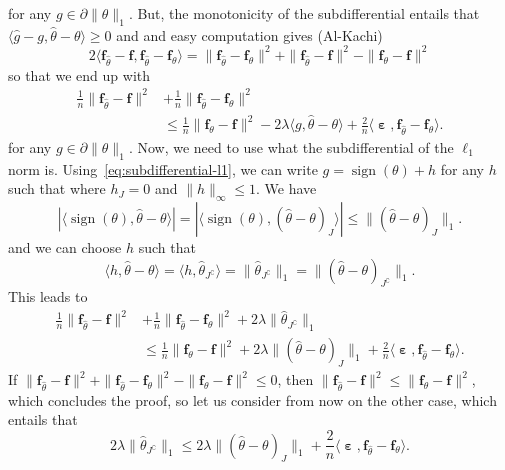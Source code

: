 \documentclass[
	fontsize=11pt, %
	twoside=false, %
	numbers=noenddot, %
]{kaobook}
\renewcommand{\bf}{{\boldsymbol f}}
\DeclareMathOperator{\beps}{\boldsymbol \varepsilon}
\newcommand{\wh}{\widehat}
\newcommand{\norm}[1]{\| #1 \|}
\newcommand{\inr}[1]{\langle #1 \rangle}
\DeclareMathOperator{\sign}{sign}
\begin{document}
for any $g \in \partial \norm{\theta}_1$. 
But, the monotonicity of the subdifferential entails that $\inr{\wh g - g, \wh \theta - \theta} \geq 0$ and and easy computation gives (Al-Kachi)
\begin{equation*}
	2 \inr{ \bf_{\wh \theta} - \bf, \bf_{\wh \theta} - \bf_{\theta}} 
	= \norm{\bf_{\wh \theta} - \bf_{\theta}}^2 
	+ \norm{\bf_{\wh \theta} - \bf}^2
	- \norm{\bf_{\theta} - \bf}^2
\end{equation*}
so that we end up with
\begin{align*}
	\frac 1n \norm{\bf_{\wh \theta} - \bf}^2 &
	+ \frac 1n \norm{\bf_{\wh \theta} - \bf_{\theta}}^2 \\
	&\leq \frac 1n \norm{\bf_{\theta} - \bf}^2
    - 2 \lambda \inr{g, \wh \theta - \theta} 
	+ \frac 2n  \inr{\beps,  \bf_{\wh \theta} - \bf_\theta}.
\end{align*}
for any $g \in \partial \norm{\theta}_1$.
Now, we need to use what the subdifferential of the $\ell_1$ norm is.
Using~\eqref{eq:subdifferential-l1}, we can write $g = \sign(\theta) + h$ for any $h$ such that where $h_J = 0$ and $\norm{h}_\infty \leq 1$.
We have 
\begin{equation*}
	|\inr{\sign(\theta), \wh \theta - \theta}| = |\inr{\sign(\theta), (\wh \theta - \theta)_J}| \leq \norm{(\wh \theta - \theta)_J}_1.
\end{equation*}
and we can choose $h$ such that
\begin{equation*}
	\inr{h, \wh \theta - \theta} = \inr{h, \wh \theta_{J^\complement}} 
	= \norm{\wh \theta_{J^\complement}}_1 
	= \norm{(\wh \theta - \theta)_{J^\complement}}_1.
\end{equation*}
This leads to
\begin{align*}
	\frac 1n \norm{\bf_{\wh \theta} - \bf}^2 &+ \frac 1n \norm{\bf_{\wh \theta} - \bf_{\theta}}^2
	+ 2 \lambda \norm{\wh \theta_{J^\complement}}_1 \\
	&\leq \frac 1n \norm{\bf_{\theta} - \bf}^2
    + 2 \lambda \norm{(\wh \theta - \theta)_J}_1
	+ \frac 2n  \inr{\beps,  \bf_{\wh \theta} - \bf_\theta}.
\end{align*}
If $\norm{\bf_{\wh \theta} - \bf}^2 + \norm{\bf_{\wh \theta} - \bf_{\theta}}^2 - \norm{\bf_{\theta} - \bf}^2 \leq 0$, then $\norm{\bf_{\wh \theta} - \bf}^2 \leq \norm{\bf_{\theta} - \bf}^2$, which concludes the proof, so let us consider from now on the other case, which entails that
\begin{equation}
	\label{eq:lasso-proof-on-A}
	2 \lambda \norm{\wh \theta_{J^\complement}}_1 
	\leq 2 \lambda \norm{(\wh \theta - \theta)_J}_1
	+ \frac 2n  \inr{\beps,  \bf_{\wh \theta} - \bf_\theta}.
\end{equation}
\end{document}
